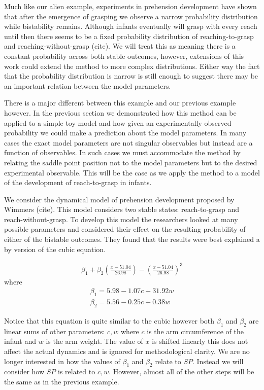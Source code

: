 \documentclass[letterpaper]{article}
\begin{document}
Much like our alien example, experiments in prehension development have shown that after
the emergence of grasping we observe a narrow probability distribution while bistability
remains. Although infants eventually will grasp with every reach until then there seems to
be a fixed probability distribution of reaching-to-grasp and reaching-without-grasp (cite).
We will treat this as meaning there is a constant probability across both stable outcomes,
however, extensions of this work could extend the method to more complex distributions.
Either way the fact that the probability distribution is narrow is still enough to suggest
there may be an important relation between the model parameters.

There is a major different between this example and our previous example however. 
In the previous  section we demonstrated how this method can be applied to a simple
toy model and how given an experimentally observed probability we could make a prediction
about the model parameters. In many cases the exact model parameters are 
not singular observables but instead are a function of observables. In such cases we 
must accommodate the method by relating the saddle point position not to the model
parameters but to the desired experimental observable.
This will be the case as we apply the method to a model of the development of 
reach-to-grasp in infants. 

We consider the dynamical model of prehension development proposed by Wimmers (cite). This
model considers two stable states: reach-to-grasp and reach-without-grasp. To develop this
model the researchers looked at many possible parameters and considered their effect on 
the resulting probability of either of the bistable outcomes. They found that the results
were best explained a by version of the cubic equation.

\begin{eqnarray}
  \beta_1 + \beta_2 (\frac{x-51.04}{26.98}) - (\frac{x-51.04}{26.98})^3
\end{eqnarray}
where
\begin{eqnarray}
  \beta_1 = 5.98 - 1.07c + 31.92w\\
  \beta_2 = 5.56 - 0.25c + 0.38w
\end{eqnarray}

Notice that this equation is quite similar to the cubic however both $\beta_1$ and 
$\beta_2$ are linear sums of other parameters: $c,w$ where $c$ is the arm circumference
of the infant and $w$ is the arm weight. The value of $x$ is shifted linearly this does 
not affect the actual dynamics and is ignored for methodological clarity. We are no longer
interested in how the values of $\beta_1$ and $\beta_2$ relate to $SP$. Instead we will
consider how $SP$ is related to $c,w$. However, almost all of the other steps will be the
same as in the previous example.
\end{document}

